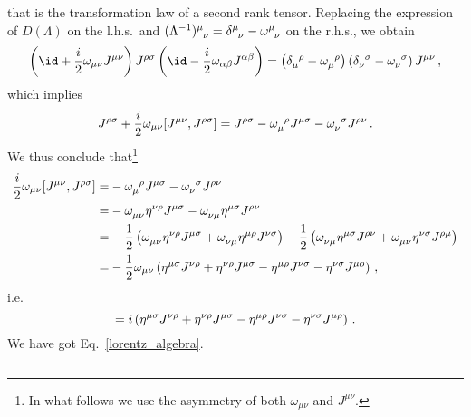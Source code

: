 \begin{sol}
\begin{enumerate}[label=\alph*)]
        that is the transformation law of a second rank tensor. Replacing the expression of $D(\Lambda)$ on the l.h.s.~and $\tensor{(\Lambda^{-1})}{^\mu_\nu}=\tensor{\delta}{^\mu_\nu} - \tensor{\omega}{^\mu_\nu}$ on the r.h.s., we obtain
        \begin{equation}
            \left(\id + \frac{i}{2} \omega_{\mu \nu} J^{\mu \nu}\right) J^{\rho \sigma} \left(\id - \frac{i}{2} \omega_{\alpha \beta} J^{\alpha \beta}\right) 
            = \left(\tensor{\delta}{_\mu^\rho} - \tensor{\omega}{_\mu^\rho} \right) \left(\tensor{\delta}{_\nu^\sigma} - \tensor{\omega}{_\nu^\sigma} \right) J^{\mu \nu} \, ,
        \end{equation}
        which implies
        \begin{equation}
            J^{\rho \sigma} + \frac{i}{2} \omega_{\mu\nu} [J^{\mu\nu}, J^{\rho \sigma}] 
            = J^{\rho \sigma} - \tensor{\omega}{_\mu^\rho} J^{\mu \sigma} - \tensor{\omega}{_\nu^\sigma} J^{\rho \nu} \, .
        \end{equation}
        We thus conclude that\footnote{In what follows we use the asymmetry of both $\omega_{\mu\nu}$ and $J^{\mu\nu}$.}
        \begin{equation}
        \begin{split}
            \frac{i}{2} \omega_{\mu\nu} [J^{\mu\nu}, J^{\rho \sigma}] 
            = & - \tensor{\omega}{_\mu^\rho} J^{\mu \sigma} - \tensor{\omega}{_\nu^\sigma} J^{\rho \nu} \\
            = & - \tensor{\omega}{_\mu_\nu} \g^{\nu \rho} J^{\mu \sigma} - \tensor{\omega}{_\nu_\mu} \g^{\mu\sigma} J^{\rho \nu} \\
            = & - \frac{1}{2} \left(\tensor{\omega}{_\mu_\nu} \g^{\nu \rho} J^{\mu \sigma} + \tensor{\omega}{_\nu_\mu} \g^{\mu \rho} J^{\nu \sigma}\right) - \frac{1}{2} \left(\tensor{\omega}{_\nu_\mu} \g^{\mu\sigma} J^{\rho \nu} + \tensor{\omega}{_\mu_\nu} \g^{\nu\sigma} J^{\rho \mu}\right) \\
            = & - \frac{1}{2} \omega_{\mu\nu} \left(\g^{\mu \sigma} J^{\nu \rho} + \g^{\nu \rho} J^{\mu \sigma} - \g^{\mu \rho} J^{\nu \sigma} - \g^{\nu \sigma} J^{\mu \rho}\right) \, ,
        \end{split}
        \end{equation}
        i.e.
        \begin{equation}
            [J^{\mu\nu}, J^{\rho \sigma}]
            = i\left(\g^{\mu \sigma} J^{\nu \rho} + \g^{\nu \rho} J^{\mu \sigma} - \g^{\mu \rho} J^{\nu \sigma} - \g^{\nu \sigma} J^{\mu \rho}\right) \, .
        \end{equation}
        We have got Eq.~\eqref{lorentz_algebra}. 
    \end{enumerate}
    $ $
\end{sol}
